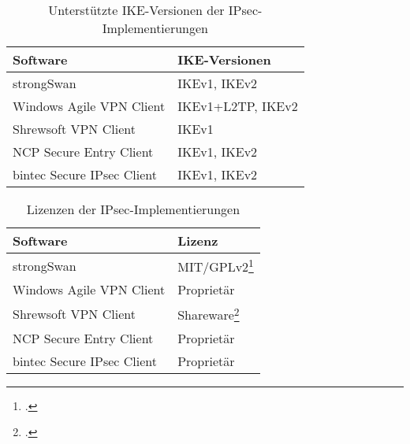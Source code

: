 \begin{center}
\begin{table}[h]
\begin{tabularx}{\textwidth}{|X|X|}\firsthline
Software & IKE-Versionen \\ \hline
strongSwan & IKEv1, IKEv2\\ \hline
Windows Agile VPN Client & IKEv1+L2TP, IKEv2 \\ \hline
Shrewsoft VPN Client & IKEv1 \\ \hline
NCP Secure Entry Client & IKEv1, IKEv2 \\ \hline
bintec Secure IPsec Client & IKEv1, IKEv2 \\ \hline
\end{tabularx}
\label{tab:IPsec-Implementierungen-IKE-Versionen}
\caption{Unterstützte IKE-Versionen der IPsec-Implementierungen}
\end{table}


\begin{table}[h]
\begin{tabularx}{\textwidth}{|X|X|}\firsthline
Software & Lizenz \\ \hline
strongSwan & MIT/GPLv2\footcite[][]{_contributions_2014} \\ \hline
Windows Agile VPN Client & Proprietär \\ \hline
Shrewsoft VPN Client & Shareware\footcite[][]{_shrew_2007} \\ \hline
NCP Secure Entry Client & Proprietär \\ \hline
bintec Secure IPsec Client & Proprietär \\ \hline
\end{tabularx}
\label{tab:IPsec-Implementierungen-Lizenzen}
\caption{Lizenzen der IPsec-Implementierungen}
\end{table}


\end{center}
